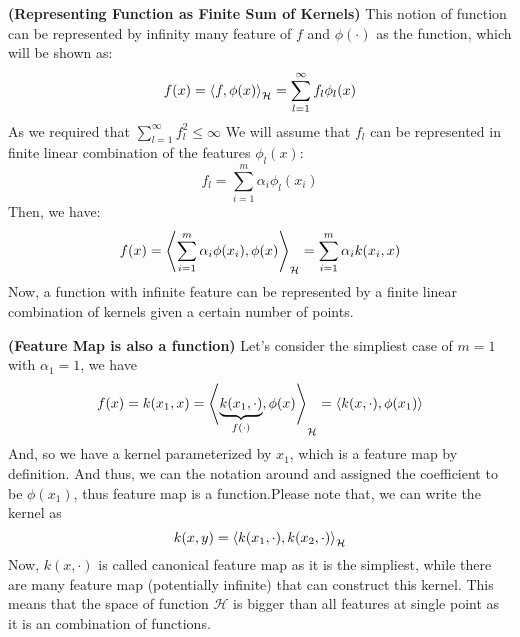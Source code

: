 \begin{remark}{\textbf{(Representing Function as Finite Sum of Kernels)}}
    This notion of function can be represented by infinity many feature of $f$ and $\phi(\cdot)$ as the function, which will be shown as:
    \begin{equation*}
        f(x) = \left\langle f, \phi(x) \right\rangle_\mathcal{H} = \sum^\infty_{l=1} f_l\phi_l(x)
    \end{equation*}
    As we required that $\sum^\infty_{l=1}f^2_l\le\infty$ We will assume that $f_l$ can be represented in finite linear combination of the features $\phi_l(x)$:
    \begin{equation*}
        f_l = \sum^m_{i=1}\alpha_i \phi_l(x_i)
    \end{equation*}
    Then, we have:
    \begin{equation*}
    \begin{aligned}
        f(x) = \left\langle \sum^m_{i=1}\alpha_i\phi(x_i), \phi(x) \right\rangle_\mathcal{H} = \sum^m_{i=1}\alpha_i k(x_i, x)
    \end{aligned}
    \end{equation*}
    Now, a function with infinite feature can be represented by a finite linear combination of kernels given a certain number of points.
\end{remark}

\begin{remark}{\textbf{(Feature Map is also a function)}}
    Let's consider the simpliest case of $m=1$ with $\alpha_1=1$, we have 
    \begin{equation*}
        f(x) = k(x_1, x) = \left\langle \underbrace{k(x_1, \cdot)}_{f(\cdot)}, \phi(x) \right\rangle_\mathcal{H} = \left\langle k(x, \cdot), \phi(x_1) \right\rangle
    \end{equation*}
    And, so we have a kernel parameterized by $x_1$, which is a feature map by definition. And thus, we can  the notation around and assigned the coefficient to be $\phi(x_1)$, thus feature map is a function.Please note that, we can write the kernel as 
    \begin{equation*}
        k(x, y)=\left\langle k(x_1,\cdot), k(x_2,\cdot) \right\rangle_\mathcal{H}
    \end{equation*}
    Now, $k(x, \cdot)$ is called canonical feature map as it is the simpliest, while there are many feature map (potentially infinite) that can construct this kernel. This means that the space of function $\mathcal{H}$ is bigger than all features at single point as it is an combination of functions. 
\end{remark}


